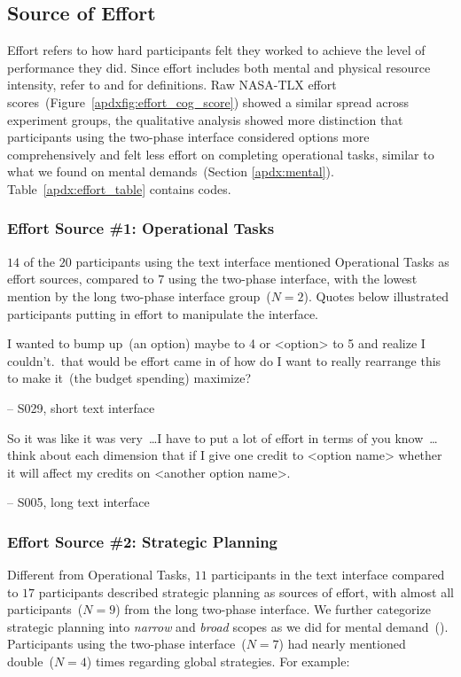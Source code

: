 \subsection{Source of Effort}
\label{apdx:effort}
Effort refers to how hard participants felt they worked to achieve the level of performance they did. Since effort includes both mental and physical resource intensity, refer to  and  for definitions. Raw NASA-TLX effort scores~(Figure~\ref{apdxfig:effort_cog_score}) showed a similar spread across experiment groups, the qualitative analysis showed more distinction that participants using the two-phase interface considered options more comprehensively and felt less effort on completing operational tasks, similar to what we found on mental demands~(Section \ref{apdx:mental}). Table~\ref{apdx:effort_table} contains codes.

\subsubsection{Effort Source \#1: Operational Tasks} $14$ of the $20$ participants using the text interface mentioned Operational Tasks as effort sources, compared to $7$ using the two-phase interface, with the lowest mention by the long two-phase interface group~($N=2$). Quotes below illustrated participants putting in effort to manipulate the interface.
\begin{displayquote}
I wanted to bump up~(an option) maybe to 4 or <option> to 5 and realize I couldn't.~\bracketellipsis that would be effort came in of how do I want to really rearrange this to make it~(the budget spending) maximize?

\noindent \hfill -- S029, short text interface
\end{displayquote}
\begin{displayquote}
So it was like it was very~\ldots I have to put a lot of effort in terms of you know~\ldots think about each dimension that if I give one credit to <option name> whether it will affect my credits on <another option name>. 

\noindent\hfill -- S005, long text interface
\end{displayquote}

\subsubsection{Effort Source \#2: Strategic Planning} Different from Operational Tasks, $11$ participants in the text interface compared to $17$ participants described strategic planning as sources of effort, with almost all participants~($N=9$) from the long two-phase interface. We further categorize strategic planning into \textit{narrow} and \textit{broad} scopes as we did for mental demand~(). Participants using the two-phase interface~($N=7$) had nearly mentioned double~($N=4$) times regarding global strategies. For example:

